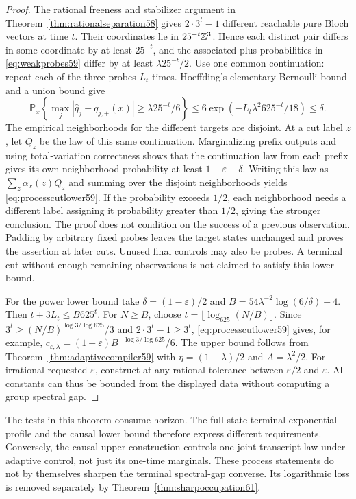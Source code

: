 \begin{proof}
The rational freeness and stabilizer argument in
Theorem~\ref{thm:rationalseparation58} gives $2\cdot3^t-1$ different
reachable pure Bloch vectors at time $t$. Their coordinates lie in
$25^{-t}\mathbb Z^3$. Hence each distinct pair differs in some coordinate by
at least $25^{-t}$, and the associated plus-probabilities in
\eqref{eq:weakprobes59} differ by at least $\lambda25^{-t}/2$.
Use one common continuation: repeat each of the three probes $L_t$
times. Hoeffding's elementary Bernoulli bound and a union bound give
\[
 \mathbb P_x\left\{\max_j|\widehat q_j-q_{j,+}(x)|
                    \ge\lambda25^{-t}/6\right\}
 \le6\exp(-L_t\lambda^2 625^{-t}/18)\le\delta.
\]
The empirical neighborhoods for the different targets are disjoint.
At a cut label $z$, let $Q_z$ be the law of this same continuation.
Marginalizing prefix outputs and using total-variation correctness
shows that the continuation law from each prefix gives its own
neighborhood probability at least $1-\varepsilon-\delta$.
Writing this law as $\sum_z\alpha_x(z)Q_z$ and summing over the disjoint
neighborhoods yields \eqref{eq:processcutlower59}. If the probability
exceeds $1/2$, each neighborhood needs a different label assigning it
probability greater than $1/2$, giving the stronger conclusion.
The proof does not condition on the success of a previous observation.
Padding by arbitrary fixed probes leaves the target states unchanged
and proves the assertion at later cuts. Unused final controls may also
be probes. A terminal cut without enough remaining observations is not
claimed to satisfy this lower bound.

For the power lower bound take $\delta=(1-\varepsilon)/2$ and
$B=54\lambda^{-2}\log(6/\delta)+4$. Then
$t+3L_t\le B625^t$. For $N\ge B$, choose
$t=\lfloor\log_{625}(N/B)\rfloor$. Since
$3^t\ge(N/B)^{\log3/\log625}/3$ and $2\cdot3^t-1\ge3^t$,
\eqref{eq:processcutlower59} gives, for example,
$c_{\varepsilon,\lambda}=(1-\varepsilon)B^{-\log3/\log625}/6$.
The upper bound follows from Theorem~\ref{thm:adaptivecompiler59} with
$\eta=(1-\lambda)/2$ and $A=\lambda^2/2$. For irrational requested
$\varepsilon$, construct at any rational tolerance between
$\varepsilon/2$ and $\varepsilon$. All constants can thus be bounded
from the displayed data without computing a group spectral gap.
\end{proof}

The tests in this theorem consume horizon. The full-state terminal
exponential profile and the causal lower bound therefore express
different requirements. Conversely, the causal upper construction
controls one joint transcript law under adaptive control, not just its
one-time marginals. These process statements do not by themselves sharpen the terminal
spectral-gap converse. Its logarithmic loss is removed separately by
Theorem~\ref{thm:sharpoccupation61}.
